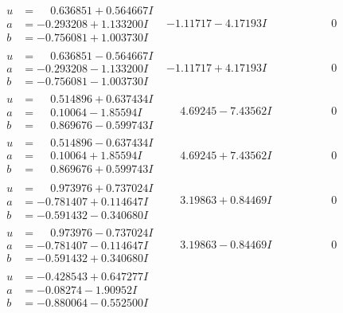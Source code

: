 \documentclass[1p]{elsarticle_modified}
\theoremstyle{definition}
\begin{document}
$$\begin{array}{c|c|c}
\begin{aligned}
u &= \phantom{-}0.636851 + 0.564667 I \\
a &= -0.293208 + 1.133200 I \\
b &= -0.756081 + 1.003730 I\end{aligned}
 & -1.11717 - 4.17193 I & \phantom{-0.000000 } 0 \\ \hline\begin{aligned}
u &= \phantom{-}0.636851 - 0.564667 I \\
a &= -0.293208 - 1.133200 I \\
b &= -0.756081 - 1.003730 I\end{aligned}
 & -1.11717 + 4.17193 I & \phantom{-0.000000 } 0 \\ \hline\begin{aligned}
u &= \phantom{-}0.514896 + 0.637434 I \\
a &= \phantom{-}0.10064 - 1.85594 I \\
b &= \phantom{-}0.869676 - 0.599743 I\end{aligned}
 & \phantom{-}4.69245 - 7.43562 I & \phantom{-0.000000 } 0 \\ \hline\begin{aligned}
u &= \phantom{-}0.514896 - 0.637434 I \\
a &= \phantom{-}0.10064 + 1.85594 I \\
b &= \phantom{-}0.869676 + 0.599743 I\end{aligned}
 & \phantom{-}4.69245 + 7.43562 I & \phantom{-0.000000 } 0 \\ \hline\begin{aligned}
u &= \phantom{-}0.973976 + 0.737024 I \\
a &= -0.781407 + 0.114647 I \\
b &= -0.591432 - 0.340680 I\end{aligned}
 & \phantom{-}3.19863 + 0.84469 I & \phantom{-0.000000 } 0 \\ \hline\begin{aligned}
u &= \phantom{-}0.973976 - 0.737024 I \\
a &= -0.781407 - 0.114647 I \\
b &= -0.591432 + 0.340680 I\end{aligned}
 & \phantom{-}3.19863 - 0.84469 I & \phantom{-0.000000 } 0 \\ \hline\begin{aligned}
u &= -0.428543 + 0.647277 I \\
a &= -0.08274 - 1.90952 I \\
b &= -0.880064 - 0.552500 I\end{aligned}

\end{array}$$
\end{document}
